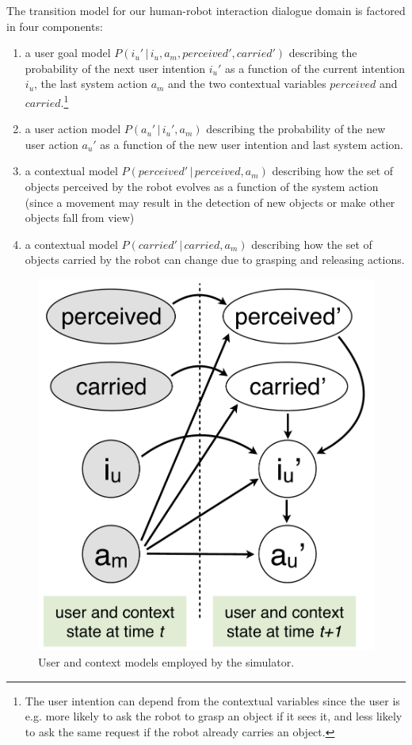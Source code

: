 The transition model for our human-robot interaction dialogue domain is factored in four components:
\begin{enumerate}
\item a user goal model $P(i_u' \, | \, i_u, a_m, \mathit{perceived}', \mathit{carried}')$ describing the probability of the next user intention $i_u'$ as a function of the current intention $i_u$, the last system action $a_m$ and the two contextual variables $\mathit{perceived}$ and $\mathit{carried}$.\footnote{The user intention can depend from the contextual variables since the user is e.g. more likely to ask the robot to grasp an object if it sees it, and less likely to ask the same request if the robot already carries an object.}
\item a user action model $P(a_u' \, | \, i_u', a_m)$ describing the probability of the new user action $a_u'$ as a function of the new user intention and last system action.
\item a contextual model $P(\mathit{perceived}' \, | \, \mathit{perceived}, a_m)$ describing how the set of objects perceived by the robot evolves as a function of the system action (since a movement may result in the detection of new objects or make other objects fall from view)
\item a contextual model $P(\mathit{carried}' \, | \, \mathit{carried}, a_m)$ describing how the set of objects carried by the robot can change due to grasping and releasing actions. 
\end{enumerate}

\begin{figure}
\vspace{-2mm}
\centering
\includegraphics[scale=0.25]{imgs/simulatormodels.pdf}
\caption{User and context models employed by the simulator.}
\label{fig:simulatormodels}
\end{figure}

